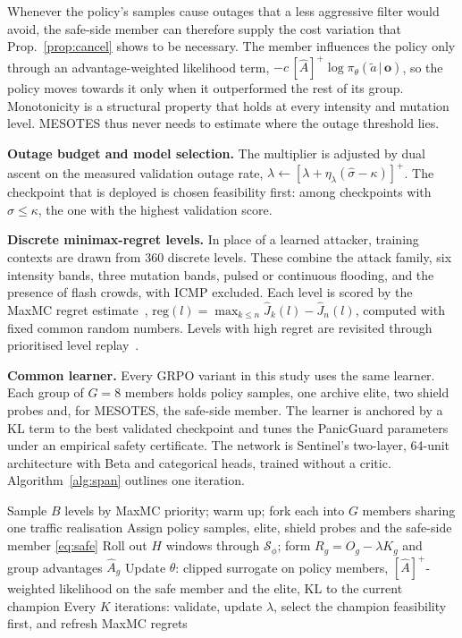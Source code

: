 \documentclass[conference]{IEEEtran}
\begin{document}
Whenever the policy's samples cause outages that a less aggressive filter would avoid, the safe-side member can therefore supply the cost variation that Prop.~\ref{prop:cancel} shows to be necessary. The member influences the policy only through an advantage-weighted likelihood term, $-c\,[\hat A]^+\log\pi_\theta(\tilde a\,|\,\mathbf{o})$, so the policy moves towards it only when it outperformed the rest of its group. Monotonicity is a structural property that holds at every intensity and mutation level. MESOTES thus never needs to estimate where the outage threshold lies.

\textbf{Outage budget and model selection.} The multiplier is adjusted by dual ascent on the measured validation outage rate, $\lambda\leftarrow[\lambda+\eta_\lambda(\hat\sigma-\kappa)]^+$. The checkpoint that is deployed is chosen feasibility first: among checkpoints with $\hat\sigma\le\kappa$, the one with the highest validation score.

\textbf{Discrete minimax-regret levels.} In place of a learned attacker, training contexts are drawn from 360 discrete levels. These combine the attack family, six intensity bands, three mutation bands, pulsed or continuous flooding, and the presence of flash crowds, with ICMP excluded. Each level is scored by the MaxMC regret estimate~\cite{jiang2021robustplr}, $\mathrm{reg}(l)=\max_{k\le n}\hat J_k(l)-\hat J_n(l)$, computed with fixed common random numbers. Levels with high regret are revisited through prioritised level replay~\cite{jiang2021plr}.

\textbf{Common learner.} Every GRPO variant in this study uses the same learner. Each group of $G=8$ members holds policy samples, one archive elite, two shield probes and, for MESOTES, the safe-side member. The learner is anchored by a KL term to the best validated checkpoint and tunes the PanicGuard parameters under an empirical safety certificate. The network is Sentinel's two-layer, 64-unit architecture with Beta and categorical heads, trained without a critic. Algorithm~\ref{alg:span} outlines one iteration.

\begin{algorithm}[t]
\caption{One MESOTES training iteration}
\label{alg:span}
\small
\begin{algorithmic}[1]
\STATE Sample $B$ levels by MaxMC priority; warm up; fork each into $G$ members sharing one traffic realisation
\STATE Assign policy samples, elite, shield probes and the safe-side member \eqref{eq:safe}
\STATE Roll out $H$ windows through $\mathcal{S}_\phi$; form $R_g=O_g-\lambda K_g$ and group advantages $\hat A_g$
\STATE Update $\theta$: clipped surrogate on policy members, $[\hat A]^+$-weighted likelihood on the safe member and the elite, KL to the current champion
\STATE Every $K$ iterations: validate, update $\lambda$, select the champion feasibility first, and refresh MaxMC regrets
\end{algorithmic}
\end{algorithm}
\end{document}
